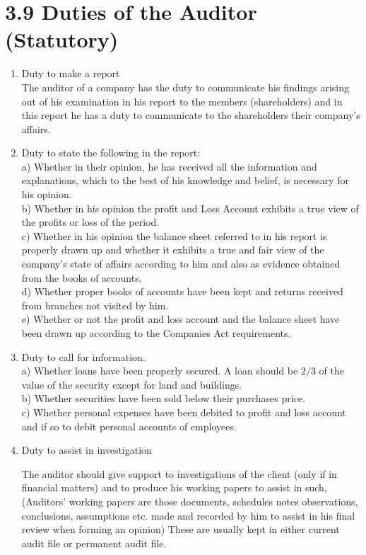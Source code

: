 \documentclass[10pt]{article}
\begin{document}
\section*{3.9 Duties of the Auditor (Statutory)}
\begin{enumerate}
  \item Duty to make a report\\
  The auditor of a company has the duty to communicate his findings arising out of his examination in his report to the members (shareholders) and in this report he has a duty to communicate to the shareholders their company's affairs.\\
  \item Duty to state the following in the report:\\
  a) Whether in their opinion, he has received all the information and explanations, which to the best of his knowledge and belief, is necessary for his opinion.\\
  b) Whether in his opinion the profit and Loss Account exhibits a true view of the profits or loss of the period.\\
  c) Whether in his opinion the balance sheet referred to in his report is properly drawn up and whether it exhibits a true and fair view of the company's state of affairs according to him and also as evidence obtained from the books of accounts.\\
  d) Whether proper books of accounts have been kept and returns received from branches not visited by him.\\
  e) Whether or not the profit and loss account and the balance sheet have been drawn up according to the Companies Act requirements.\\
  \item Duty to call for information.\\
  a) Whether loans have been properly secured. A loan should be $2 / 3$ of the value of the security except for land and buildings.\\
  b) Whether securities have been sold below their purchases price.\\
  c) Whether personal expenses have been debited to profit and loss account and if so to debit personal accounts of employees.\\
  \item Duty to assist in investigation
  
  The auditor should give support to investigations of the client (only if in financial matters) and to produce his working papers to assist in such, (Auditors' working papers are those documents, schedules notes observations, conclusions, assumptions etc. made and recorded by him to assist in his final review when forming an opinion) These are usually kept in either current audit file or permanent audit file.
  

\end{enumerate}
\end{document}
